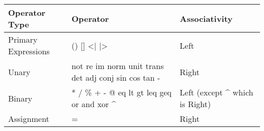 \begin{flushleft}
\begin{tabular}{|l|l|l|}
	\hline    
	                   
	Operator Type & 
	Operator & 
	Associativity\\
	
	\hline
	Primary Expressions &
	\textsf{() [] <| |>} &
	Left\\
	Unary & 
	\textsf{not re im norm unit trans det adj conj sin cos tan -} & 
	Right\\
	Binary & 
	\textsf{* / \% + - @ eq lt gt leq geq or and xor \string^} &
	Left (except \string^ which is Right)\\
	Assignment &
	\textsf{=} 
	& Right\\
	
	\hline  
\end{tabular}
\end{flushleft}
